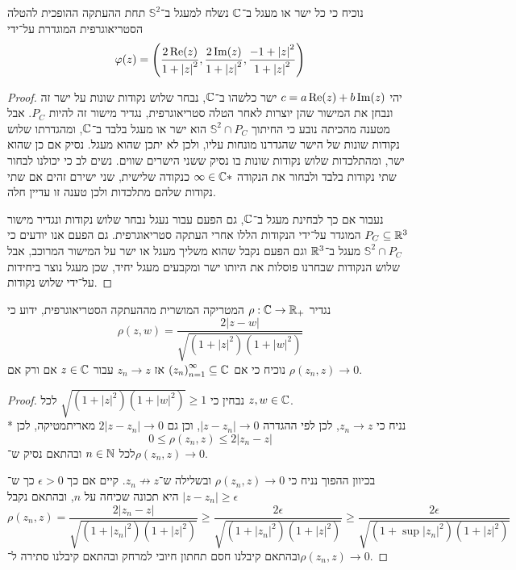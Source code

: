 \Question{}
\Subquestion{}
נוכיח כי כל ישר או מעגל ב־$\mathbb{C}$ נשלח למעגל ב־$\mathbb{S}^2$ תחת ההעתקה ההופכית להטלה הסטריאוגרפית המוגדרת על־ידי
\[
	\varphi(z) = \left( \frac{2 \operatorname{Re}(z)}{1 + {|z|}^2}, \frac{2 \operatorname{Im}(z)}{1 + {|z|}^2}, \frac{-1 + {|z|}^2}{1 + {|z|}^2} \right)
\]
\begin{proof}
	יהי $c = a \operatorname{Re}(z) + b \operatorname{Im}(z)$ ישר כלשהו ב־$\mathbb{C}$, נבחר שלוש נקודות שונות על ישר זה ונבחן את המישור שהן יוצרות לאחר הטלה סטריאוגרפית, נגדיר מישור זה להיות $P_C$.
	אבל מטענה מהכיתה נובע כי החיתוך $\mathbb{S}^2 \cap P_C$ הוא ישר או מעגל בלבד ב־$\mathbb{C}$, ומהגדרתו שלוש נקודות שונות של הישר שהגדרנו מונחות עליו, ולכן לא יתכן שהוא מעגל.
	נסיק אם כן שהוא ישר, ומהתלכדות שלוש נקודות שונות בו נסיק ששני הישרים שווים.
	נשים לב כי יכולנו לבחור שתי נקודות בלבד ולבחור את הנקודה $\infty \in \mathbb{C}*$ כנקודה שלישית, שני ישירם זהים אם שתי נקודות שלהם מתלכדות ולכן טענה זו עדיין חלה.

	נעבור אם כך לבחינת מעגל ב־$\mathbb{C}$, גם הפעם עבור נעגל נבחר שלוש נקודות ונגדיר מישור $P_C \subseteq \mathbb{R}^3$ המוגדר על־ידי הנקודות הללו אחרי העתקה סטריאוגרפית.
	גם הפעם אנו יודעים כי $\mathbb{S}^2 \cap P_C$ מעגל ב־$\mathbb{R}^3$ וגם הפעם נקבל שהוא משליך מעגל או ישר על המישור המרוכב, אבל שלוש הנקודות שבחרנו פוסלות את היותו ישר ומקבעים מעגל יחיד, שכן מעגל נוצר ביחידות על־ידי שלוש נקודות.
\end{proof}

\Subquestion{}
נגדיר $\rho : \mathbb{C} \to \mathbb{R}_+$ המטריקה המושרית מההעתקה הסטריאוגרפית, ידוע כי
\[
	\rho(z, w) = \frac{2|z - w|}{\sqrt{(1 + {|z|}^2)(1 + {|w|}^2)}}
\]
נוכיח כי אם ${(z_n)}_{n = 1}^\infty \subseteq \mathbb{C}$ אז $z_n \to z$ עבור $z \in \mathbb{C}$ אם ורק אם $\rho(z_n, z) \to 0$.
\begin{proof}
	נבחין כי $\sqrt{(1 + {|z|}^2)(1 + {|w|}^2)} \ge 1$ לכל $z, w \in \mathbb{C}$. \\*
	נניח כי $z_n \to z$, לכן לפי ההגדרה $|z - z_n| \to 0$, וכן גם $2|z - z_n| \to 0$ מאריתמטיקה, לכן
	\[
		0 \le \rho(z_n, z) \le 2|z_n - z|
	\]
	לכל $n \in \mathbb{N}$ ובהתאם נסיק ש־$\rho(z_n, z) \to 0$.

	בכיוון ההפוך נניח כי $\rho(z_n, z) \to 0$ ובשלילה ש־$z_n \not\to z$.
	קיים אם כך $\epsilon > 0$ כך ש־$|z - z_n| \ge \epsilon$ היא תכונה שכיחה על $n$, ובהתאם נקבל
	\[
		\rho(z_n, z) = \frac{2|z_n - z|}{\sqrt{(1 + {|z_n|}^2)(1 + {|z|}^2)}}
		\ge \frac{2\epsilon}{\sqrt{(1 + {|z_n|}^2)(1 + {|z|}^2)}}
		\ge \frac{2\epsilon}{\sqrt{(1 + \sup {|z_n|}^2)(1 + {|z|}^2)}}
	\]
	ובהתאם קיבלנו חסם תחתון חיובי למרחק ובהתאם קיבלנו סתירה ל־$\rho(z_n, z) \to 0$.
\end{proof}

